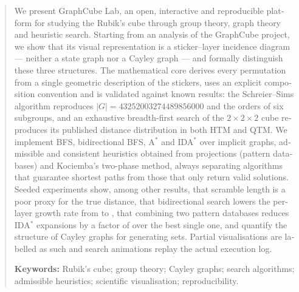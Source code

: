 \begin{otherlanguage}{english}
\begin{abstract}
\noindent
We present GraphCube Lab, an open, interactive and reproducible platform for studying the Rubik's cube through group theory, graph theory and heuristic search. Starting from an analysis of the GraphCube project, we show that its visual representation is a sticker--layer incidence diagram --- neither a state graph nor a Cayley graph --- and formally distinguish these three structures. The mathematical core derives every permutation from a single geometric description of the stickers, uses an explicit composition convention and is validated against known results: the Schreier--Sims algorithm reproduces $|G| = \num{43252003274489856000}$ and the orders of six subgroups, and an exhaustive breadth-first search of the $2\times2\times2$ cube reproduces its published distance distribution in both HTM and QTM. We implement BFS, bidirectional BFS, A$^*$ and IDA$^*$ over implicit graphs, admissible and consistent heuristics obtained from projections (pattern databases) and Kociemba's two-phase method, always separating algorithms that guarantee shortest paths from those that only return valid solutions. Seeded experiments show, among other results, that scramble length is a poor proxy for the true distance, that bidirectional search lowers the per-layer growth rate from \gclEoneGrowthBFS{} to \gclEoneGrowthBi{}, that combining two pattern databases reduces IDA$^*$ expansions by a factor of \gclEthreeMaxOverPerm{} over the best single one, and quantify the structure of Cayley graphs for \gclEfourSets{} generating sets. Partial visualisations are labelled as such and search animations replay the actual execution log.

\medskip\noindent\textbf{Keywords:} Rubik's cube; group theory; Cayley graphs; search algorithms; admissible heuristics; scientific visualisation; reproducibility.
\end{abstract}
\end{otherlanguage}
